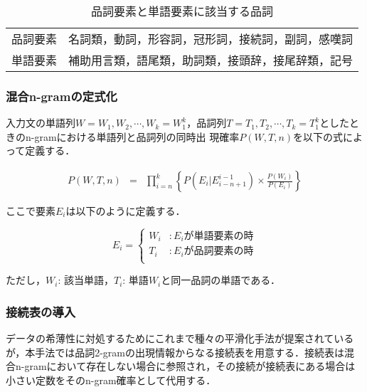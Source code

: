 \begin{table}
\begin{center}
\caption{品詞要素と単語要素に該当する品詞}
\label{表:要素}
\begin{tabular}{l|l}
\hline\hline
品詞要素 &  名詞類，動詞，形容詞，冠形詞，接続詞，副詞，感嘆詞\\
単語要素 &  補助用言類，語尾類，助詞類，接頭辞，接尾辞類，記号\\
\hline
\end{tabular}
\end{center}
\end{table}


\subsubsection{混合n-gramの定式化}

入力文の単語列$W=W_1, W_2, \cdots, W_k = W_1^k$，品詞列$T=T_1, T_2,
 \cdots, T_k = T_1^k$としたときのn-gramにおける単語列と品詞列の同時出
現確率$P(W,T,n)$を以下の式によって定義する．

{\small
\begin{eqnarray}
P(W, T, n) & = &
\prod^{k}_{i=n}\left\{P(E_{i}|E_{i-n+1}^{i-1})
 \times \frac{P(W_{i})}{P(E_{i})} \right\}
\end{eqnarray}
}

\noindent
ここで要素$E_i$は以下のように定義する．

\begin{equation}
E_i = \left\{
\begin{array}{ll}
W_i &   : E_i が単語要素の時 \\
T_i &   : E_i が品詞要素の時 \\
\end{array}
\right.
\end{equation}

\noindent
ただし，$W_i$: 該当単語，$T_i$: 単語$W_i$と同一品詞の単語である．



\subsubsection{接続表の導入}

データの希薄性に対処するためにこれまで種々の平滑化手法が提案されている
が，本手法では品詞2-gramの出現情報からなる接続表を用意する．接続表は混
合n-gramにおいて存在しない場合に参照され，その接続が接続表にある場合は
小さい定数をそのn-gram確率として代用する．




